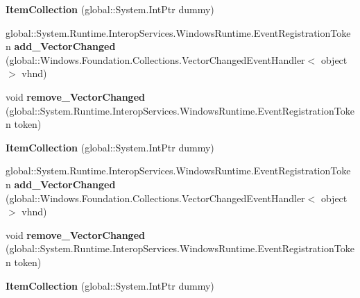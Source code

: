 \begin{DoxyCompactItemize}
{\bfseries Item\+Collection} (global\+::\+System.\+Int\+Ptr dummy)
\item 
\mbox{\label{class_windows_1_1_u_i_1_1_xaml_1_1_controls_1_1_item_collection_a920f67d58690f01bbcb0c548e064083c}} 
global\+::\+System.\+Runtime.\+Interop\+Services.\+Windows\+Runtime.\+Event\+Registration\+Token {\bfseries add\+\_\+\+Vector\+Changed} (global\+::\+Windows.\+Foundation.\+Collections.\+Vector\+Changed\+Event\+Handler$<$ object $>$ vhnd)
\item 
\mbox{\label{class_windows_1_1_u_i_1_1_xaml_1_1_controls_1_1_item_collection_afdfa282fb26aff5d9800af371b2a81a6}} 
void {\bfseries remove\+\_\+\+Vector\+Changed} (global\+::\+System.\+Runtime.\+Interop\+Services.\+Windows\+Runtime.\+Event\+Registration\+Token token)
\item 
\mbox{\label{class_windows_1_1_u_i_1_1_xaml_1_1_controls_1_1_item_collection_a42920e204a2cf93fedbd9741da1bd6e6}} 
{\bfseries Item\+Collection} (global\+::\+System.\+Int\+Ptr dummy)
\item 
\mbox{\label{class_windows_1_1_u_i_1_1_xaml_1_1_controls_1_1_item_collection_a920f67d58690f01bbcb0c548e064083c}} 
global\+::\+System.\+Runtime.\+Interop\+Services.\+Windows\+Runtime.\+Event\+Registration\+Token {\bfseries add\+\_\+\+Vector\+Changed} (global\+::\+Windows.\+Foundation.\+Collections.\+Vector\+Changed\+Event\+Handler$<$ object $>$ vhnd)
\item 
\mbox{\label{class_windows_1_1_u_i_1_1_xaml_1_1_controls_1_1_item_collection_afdfa282fb26aff5d9800af371b2a81a6}} 
void {\bfseries remove\+\_\+\+Vector\+Changed} (global\+::\+System.\+Runtime.\+Interop\+Services.\+Windows\+Runtime.\+Event\+Registration\+Token token)
\item 
\mbox{\label{class_windows_1_1_u_i_1_1_xaml_1_1_controls_1_1_item_collection_a42920e204a2cf93fedbd9741da1bd6e6}} 
{\bfseries Item\+Collection} (global\+::\+System.\+Int\+Ptr dummy)

\end{DoxyCompactItemize}
